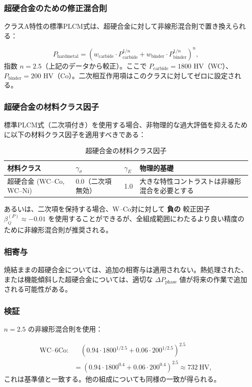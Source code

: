 \documentclass[12pt,a4paper]{article}
\begin{document}
	\subsubsection{超硬合金のための修正混合則}
	クラスA特性の標準PLCM式は、超硬合金に対して非線形混合則で置き換えられる：
	
	\[
	P_{\text{hardmetal}} = \left( w_{\text{carbide}} \cdot P_{\text{carbide}}^{1/n} + w_{\text{binder}} \cdot P_{\text{binder}}^{1/n} \right)^{n},
	\]
	指数 $n = 2.5$（上記のデータから較正）。ここで $P_{\text{carbide}} = 1800$ HV（WC）、$P_{\text{binder}} = 200$ HV（Co）。二次相互作用項はこのクラスに対してゼロに設定される。
	
	\subsubsection{超硬合金の材料クラス因子}
	標準PLCM式（二次項付き）を使用する場合、非物理的な過大評価を抑えるために以下の材料クラス因子を適用すべきである：
	
	\begin{longtable}{p{3.5cm} p{2.5cm} p{2.5cm} p{5cm}}
		\caption{超硬合金の材料クラス因子}\\
		\toprule
		\textbf{材料クラス} & $\gamma_{\sigma}$ & $\gamma_{E}$ & \textbf{物理的基礎} \\
		\midrule
		超硬合金 (WC–Co, WC–Ni) & 0.0（二次項無効） & 1.0 & 大きな特性コントラストは非線形混合を必要とする \\
		\bottomrule
	\end{longtable}
	
	あるいは、二次項を保持する場合、W–Co対に対して \textbf{負の} 較正因子 $\beta_{ij}^{(P)} \approx -0.01$ を使用することができるが、全組成範囲にわたるより良い精度のために非線形混合則が推奨される。
	
	\subsubsection{相寄与}
	焼結ままの超硬合金については、追加の相寄与は適用されない。熱処理された、または機能傾斜した超硬合金については、適切な $\Delta P_{\text{phase}}$ 値が将来の作業で追加される可能性がある。
	
	\subsubsection{検証}
	$n=2.5$ の非線形混合則を使用：
	
	\[
	\begin{aligned}
		\text{WC–6Co:}&\quad (0.94\cdot1800^{1/2.5} + 0.06\cdot200^{1/2.5})^{2.5} \\
		&= (0.94\cdot1800^{0.4} + 0.06\cdot200^{0.4})^{2.5} \approx 732\ \text{HV},
	\end{aligned}
	\]
	これは基準値と一致する。他の組成についても同様の一致が得られる。
	
\end{document}
